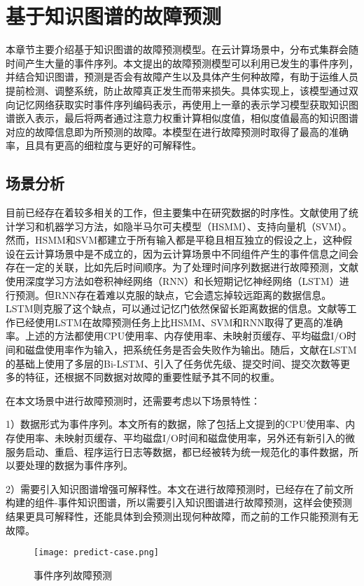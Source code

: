 \chapter{基于知识图谱的故障预测}
本章节主要介绍基于知识图谱的故障预测模型。在云计算场景中，分布式集群会随时间产生大量的事件序列。本文提出的故障预测模型可以利用已发生的事件序列，并结合知识图谱，预测是否会有故障产生以及具体产生何种故障，有助于运维人员提前检测、调整系统，防止故障真正发生而带来损失。具体实现上，该模型通过双向记忆网络获取实时事件序列编码表示，再使用上一章的表示学习模型获取知识图谱嵌入表示，最后将两者通过注意力权重计算相似度值，相似度值最高的知识图谱对应的故障信息即为所预测的故障。本模型在进行故障预测时取得了最高的准确率，且具有更高的细粒度与更好的可解释性。
\section{场景分析}
目前已经存在着较多相关的工作，但主要集中在研究数据的时序性。文献\parencite{pitakrat2018hora,zhang2018prefix,baldoni2015line}使用了统计学习和机器学习方法，如隐半马尔可夫模型（HSMM）、支持向量机（SVM）。然而，HSMM和SVM都建立于所有输入都是平稳且相互独立的假设之上，这种假设在云计算场景中是不成立的，因为云计算场景中不同组件产生的事件信息之间会存在一定的关联，比如先后时间顺序。为了处理时间序列数据进行故障预测，文献\parencite{xu2016health,cheng2018machine,du2017deeplog,das2018desh,islam2017predicting}使用深度学习方法如卷积神经网络（RNN）和长短期记忆神经网络（LSTM）进行预测。但RNN存在着难以克服的缺点，它会遗忘掉较远距离的数据信息。LSTM则克服了这个缺点，可以通过记忆门依然保留长距离数据的信息。文献\parencite{cheng2018machine,du2017deeplog,das2018desh}等工作已经使用LSTM在故障预测任务上比HSMM、SVM和RNN取得了更高的准确率。上述的方法都使用CPU使用率、内存使用率、未映射页缓存、平均磁盘I/O时间和磁盘使用率作为输入，把系统任务是否会失败作为输出。随后，文献\parencite{gao2020task}在LSTM的基础上使用了多层的Bi-LSTM、引入了任务优先级、提交时间、提交次数等更多的特征，还根据不同数据对故障的重要性赋予其不同的权重。

在本文场景中进行故障预测时，还需要考虑以下场景特性：

1）数据形式为事件序列。本文所有的数据，除了包括上文提到的CPU使用率、内存使用率、未映射页缓存、平均磁盘I/O时间和磁盘使用率，另外还有新引入的微服务启动、重启、程序运行日志等数据，都已经被转为统一规范化的事件数据，所以要处理的数据为事件序列。

2）需要引入知识图谱增强可解释性。本文在进行故障预测时，已经存在了前文所构建的组件-事件知识图谱，所以需要引入知识图谱进行故障预测，这样会使预测结果更具可解释性，还能具体到会预测出现何种故障，而之前的工作只能预测有无故障。
\begin{figure}[htbp]
    \centering
    \texttt{[image: predict-case.png]}
    \caption{事件序列故障预测\label{predict-case}}
\end{figure}

